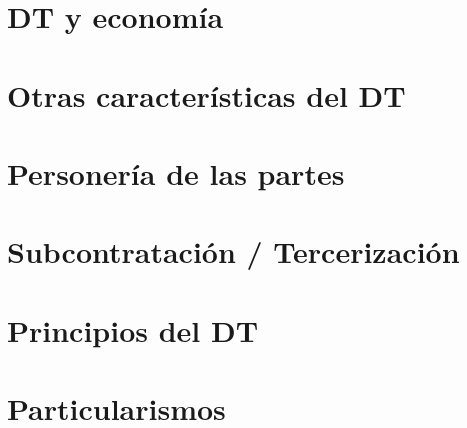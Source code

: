 \documentclass[../main.tex]{subfiles}
\begin{document}
\section{DT y economía}

\section{Otras características del DT}

\section{Personería de las partes}

\section{Subcontratación / Tercerización}

\section{Principios del DT}

\section{Particularismos}
\end{document}
